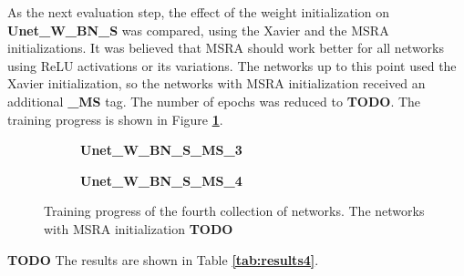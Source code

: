 \noindent As the next evaluation step, the effect of the weight initialization on \textbf{Unet\_W\_BN\_S} was compared, using the Xavier and the MSRA initializations. It was believed that MSRA should work better for all networks using ReLU activations or its variations. The networks up to this point used the Xavier initialization, so the networks with MSRA initialization received an additional \textbf{\_MS} tag. The number of epochs was reduced to \textbf{TODO}. The training progress is shown in Figure \textbf{\ref{fig:weighted_batchnorm_shuffle_msra_training}}.\\

\begin {figure}[!ht]
	\begin {subfigure}[b]{0.4\linewidth}
		\caption{\textbf{Unet\_W\_BN\_S\_MS\_3}}
	\end {subfigure}\hspace{1.75cm}
	\begin {subfigure}[b]{0.4\linewidth}
		\caption{\textbf{Unet\_W\_BN\_S\_MS\_4}}
	\end {subfigure}

		\caption[Training progress of the fourth collection of networks.]{Training progress of the fourth collection of networks. The networks with MSRA initialization \textbf{TODO}}
		\label{fig:weighted_batchnorm_shuffle_msra_training}
\end {figure}


\textbf{TODO} The results are shown in Table \textbf{\ref{tab:results4}}. \\


